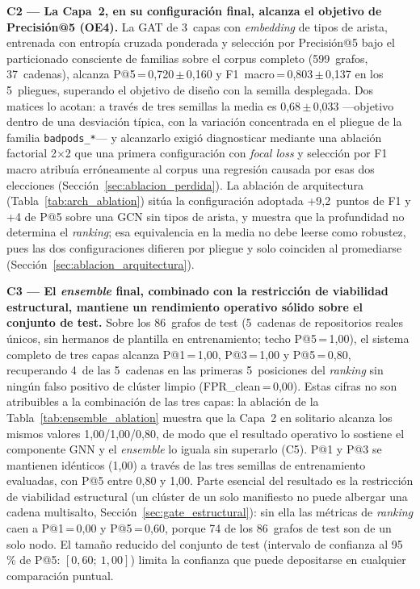 \textbf{C2 — La Capa~2, en su configuración final, alcanza el objetivo de
Precisión@5 (OE4).} La \ac{GAT} de 3~capas con \textit{embedding} de tipos de
arista, entrenada con entropía cruzada ponderada y selección por Precisión@5 bajo
el particionado consciente de familias sobre el corpus completo (599~grafos,
37~cadenas), alcanza P@5\,=\,0,720\,\(\pm\)\,0,160 y
F1~macro\,=\,0,803\,\(\pm\)\,0,137 en los 5~pliegues, superando el objetivo de
diseño con la semilla desplegada. Dos matices lo acotan: a través de tres semillas
la media es 0,68\,\(\pm\)\,0,033 —objetivo dentro de una desviación típica, con la
variación concentrada en el pliegue de la familia \texttt{badpods\_*}— y alcanzarlo
exigió diagnosticar mediante una ablación factorial 2\(\times\)2 que una primera
configuración con \textit{focal loss} y selección por F1 macro atribuía
erróneamente al corpus una regresión causada por esas dos elecciones
(Sección~\ref{sec:ablacion_perdida}). La ablación de arquitectura
(Tabla~\ref{tab:arch_ablation}) sitúa la configuración adoptada +9,2~puntos de F1 y
+4 de P@5 sobre una \ac{GCN} sin tipos de arista, y muestra que la profundidad no
determina el \textit{ranking}; esa equivalencia en la media no debe leerse como
robustez, pues las dos configuraciones difieren por pliegue y solo coinciden al
promediarse (Sección~\ref{sec:ablacion_arquitectura}).

\textbf{C3 — El \textit{ensemble} final, combinado con la restricción de
viabilidad estructural, mantiene un rendimiento operativo sólido sobre el
conjunto de test.} Sobre los 86~grafos de test (5~cadenas de repositorios reales
únicos, sin hermanos de plantilla en entrenamiento; techo P@5\,=\,1,00), el
sistema completo de tres capas alcanza P@1\,=\,1,00, P@3\,=\,1,00 y
P@5\,=\,0,80, recuperando 4~de las 5~cadenas en las primeras 5~posiciones del
\textit{ranking} sin ningún falso positivo de clúster limpio
(\ac{FPR}\_clean\,=\,0,00). Estas cifras no son atribuibles a la combinación de
las tres capas: la ablación de la Tabla~\ref{tab:ensemble_ablation} muestra que
la Capa~2 en solitario alcanza los mismos valores 1,00/1,00/0,80, de modo que el
resultado operativo lo sostiene el componente \ac{GNN} y el \textit{ensemble}
lo iguala sin superarlo (C5). P@1 y P@3 se mantienen idénticos (1,00) a través de
las tres semillas de entrenamiento evaluadas, con P@5 entre 0,80 y 1,00. Parte esencial del resultado es la
restricción de viabilidad estructural (un clúster de un solo manifiesto no puede
albergar una cadena multisalto, Sección~\ref{sec:gate_estructural}): sin ella
las métricas de \textit{ranking} caen a P@1\,=\,0,00 y P@5\,=\,0,60, porque 74 de los
86~grafos de test son de un solo nodo. El tamaño reducido del conjunto de test
(intervalo de confianza al 95\,\% de P@5: \([0{,}60;\ 1{,}00]\)) limita la
confianza que puede depositarse en cualquier comparación puntual.

